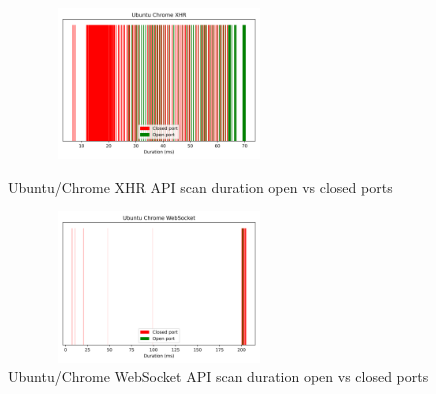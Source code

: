 \begin{figure}[ht]
\centering
\begin{minipage}{.45\textwidth}
  \centering
\includegraphics[width=8cm, height=4cm, keepaspectratio]{port_scanning_techniques/img/ubuntu_chrome_efficacy_xhr.png}
    \caption{Ubuntu/Chrome XHR API scan duration open vs closed ports}
    \label{fig:ubuntu-chrome-xhr}
\end{minipage}
\hspace{0.5cm} %
\begin{minipage}{.45\textwidth}
\includegraphics[width=8cm, height=4cm, keepaspectratio]{port_scanning_techniques/img/ubuntu_chrome_efficacy_websocket.png}
    \caption{Ubuntu/Chrome WebSocket API scan duration open vs closed ports}
    \label{fig:ubuntu-chrome-websocket}
\end{minipage}
\end{figure}

